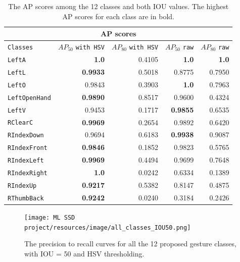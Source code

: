 \documentclass[10pt,twocolumn,letterpaper]{article}
\begin{document}
\begin{flushleft}
\def\arraystretch{1.2}%
\begin{table}[!h]
    \begin{center}    
        \begin{tabular}{l|r|r|r|r}
        \hline
        \multicolumn{5}{c}{AP scores}\\
        \hline
        \hline
        \texttt{Classes} & $AP_{50}$ \texttt{with HSV} & $AP_{80}$ \texttt{with HSV} & $AP_{50}$ \texttt{raw} & $AP_{80}$ \texttt{raw}\\
        \hline
        \texttt{LeftA} & \textbf{1.0} & 0.4105 & \textbf{1.0} & \textbf{1.0} \\
        \hline
        \texttt{LeftL} & \textbf{0.9933} & 0.5018 & 0.8775 & 0.7950 \\
        \hline
        \texttt{LeftO} & 0.9843 & 0.3903 & \textbf{1.0} & 0.7963 \\
        \hline
        \texttt{LeftOpenHand} & \textbf{0.9890} & 0.8517 & 0.9600 & 0.4324 \\
        \hline
        \texttt{LeftV} & 0.9453 & 0.1717 & \textbf{0.9855} & 0.6535 \\
        \hline
        \texttt{RClearC} & \textbf{0.9969} & 0.2654 & 0.9892 & 0.6420 \\
        \hline
        \texttt{RIndexDown} & 0.9694 & 0.6183 & \textbf{0.9938} & 0.9087 \\
        \hline
        \texttt{RIndexFront}  & \textbf{0.9846} & 0.1852 & 0.9823 & 0.5765 \\
        \hline
        \texttt{RIndexLeft}  & \textbf{0.9969} & 0.4494 & 0.9699 & 0.7648 \\
        \hline
        \texttt{RIndexRight}  & \textbf{1.0} & 0.0242 & 0.6334 & 0.1389 \\
        \hline
        \texttt{RIndexUp} & \textbf{0.9217} & 0.5382 & 0.8147 & 0.4875\\
        \hline
        \texttt{RThumbBack} & \textbf{0.9242} & 0.0240 & 0.3184 & 0.2426 \\
        \hline
        \end{tabular}
    \end{center}
    \caption{The AP scores among the 12 classes and both IOU values. The highest AP scores for each class are in bold.}
    \label{table1}
\end{table}

\begin{figure}[!h]
    \centering
    \texttt{[image: ML SSD project/resources/image/all\_classes\_IOU50.png]}
    \caption{The precision to recall curves for all the 12 proposed gesture classes, with IOU = 50 and HSV thresholding.}
\end{figure}
\label{figure7}


\end{flushleft}
\end{document}
